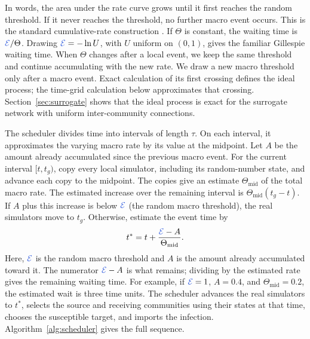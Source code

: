 \documentclass{ieeeaccess}
\newcommand{\michael}[2]{{\color{RoyalBlue}#1}}
\begin{document}
In words, the area under the rate curve grows until it first reaches the random threshold. If it never reaches the threshold, no further macro event occurs. This is the standard cumulative-rate construction \cite{ethier1986,anderson2007}. If $\Theta$ is constant, the waiting time is $\michael{\mathcal E}{E}/\Theta$. Drawing $\michael{\mathcal E}{E}=-\ln U$, with $U$ uniform on $(0,1)$, gives the familiar Gillespie waiting time. When $\Theta$ changes after a local event, we keep the same threshold and continue accumulating with the new rate. We draw a new macro threshold only after a macro event. Exact calculation of its first crossing defines the ideal process; the time-grid calculation below approximates that crossing. Section~\ref{sec:surrogate} shows that the ideal process is exact for the surrogate network with uniform inter-community connections.

The scheduler divides time into intervals of length $\tau$. On each interval, it approximates the varying macro rate by its value at the midpoint. Let $A$ be the amount already accumulated since the previous macro event. For the current interval $[t,t_g)$, copy every local simulator, including its random-number state, and advance each copy to the midpoint. The copies give an estimate $\Theta_{\mathrm{mid}}$ of the total macro rate. The estimated increase over the remaining interval is $\Theta_{\mathrm{mid}}(t_g-t)$. If $A$ plus this increase is below $\michael{\mathcal E}{E}$ (the random macro threshold), the real simulators move to $t_g$. Otherwise, estimate the event time by
\begin{equation}
\label{eq:interpolation}
t^\ast=t+\frac{\michael{\mathcal E}{E}-A}{\Theta_{\mathrm{mid}}}.
\end{equation}
Here, $\michael{\mathcal E}{E}$ is the random macro threshold and $A$ is the amount already accumulated toward it. The numerator $\michael{\mathcal E}{E}-A$ is what remains; dividing by the estimated rate gives the remaining waiting time. For example, if $\michael{\mathcal E}{E}=1$, $A=0.4$, and $\Theta_{\mathrm{mid}}=0.2$, the estimated wait is three time units. The scheduler advances the real simulators to $t^\ast$, selects the source and receiving communities using their states at that time, chooses the susceptible target, and imports the infection. Algorithm~\ref{alg:scheduler} gives the full sequence.
\end{document}
